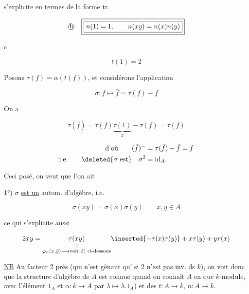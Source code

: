 
  s'explicite \uline{en} termes de  la forme tr.

\[
\text{\textcircled{b}}\quad\boxed{\boxed{n(1)=1,\qquad n(xy)=n(x)n(y)}}
\]


\textcircled{c}  

\[
\boxed{t(1)=2}
\]

Posons $\tau(f)=\alpha(t(f))$, et considérons l'application

\[
\sigma:f\longmapsto\bar f=\tau(f)-f
\]

 On a

\[
\tau(\bar f)=\tau(f)\underbrace{\tau(1)}_{2}-\tau(f)=\tau(f)
\]

\[
\begin{aligned}
\text{d'où}\qquad(\bar f)^{-}&=\tau(\bar f)-\bar f=f\\
\text{i.e.}\qquad\deleted{\sigma\ \mathrm{est}}\quad\sigma^2&=\mathrm{id}_A.
\end{aligned}
\]


Ceci posé, on veut que l'on ait

1°) $\sigma$ \uline{est un} autom. d'algèbre, i.e.

\[
\boxed{\boxed{\sigma(xy)=\sigma(x)\sigma(y)}}\qquad x,y\in A
\]

ce qui s'explicite aussi

\[
2xy=\underset{\substack{\Vert\\\varphi_n(x,\bar y)\longrightarrow\text{voir d) ci-dessous}}}{\tau(xy)}
\inserted{-\tau(x)\tau(y)}+x\tau(y)+y\tau(x)
\]


\uline{NB} Au facteur $2$ près (qui n'est gênant qu' si $2$ n'est pas inv. ds $k$), on voit donc que la structure d'algèbre de $A$ est connue quand on connaît $A$ en  que $k$-module, avec l'élément $1_A$ et   $\alpha:k\longrightarrow A$ par $\lambda\longmapsto\lambda.1_A$) et des  $t:A\longrightarrow k$, $n:A\longrightarrow k$.

